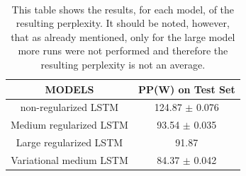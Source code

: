 \documentclass[a4paper]{article}
\begin{document}
\\
\begin{table}[h]
        \centering
        \begin{tabular}{|c|c|}
            \hline
            MODELS & PP(W) on Test Set\\
            \hline
            non-regularized LSTM & 124.87 $\pm$ 0.076\\
            \hline
            Medium regularized LSTM & 93.54 $\pm$ 0.035\\
            \hline
            Large regularized LSTM & 91.87\\
            \hline
            Variational medium LSTM & 84.37 $\pm$ 0.042\\
            \hline
        \end{tabular}
        \caption{This table shows the results, for each model, of the resulting perplexity. It should be noted, however, that as already mentioned, only for the large model more runs were not performed and therefore the resulting perplexity is not an average.}
        \label{tab: ppl_results}
\end{table}
\\
\end{document}
